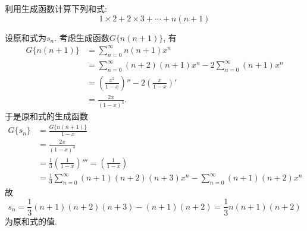 \documentclass[chinese]{assignment}[2019/10/15]
\newcommand{\lr}[3]{\left#1#3\right#2}
\begin{document}
    \begin{problem}
        利用生成函数计算下列和式:
        \begin{equation}
            1\times 2 + 2\times 3 + \dotsb + n(n+1)
        \end{equation}
    \end{problem}
    \begin{solution}
        设原和式为$s_n$. 考虑生成函数$G\{n(n+1)\}$, 有
        \begin{equation}
            \begin{aligned}
                G\{n(n+1)\}
                &=\sum_{n=0}^\infty n(n+1)x^n\\
                &= \sum_{n=0}^\infty (n+2)(n+1)x^n - 2\sum_{n=0}^{\infty}(n+1)x^n\\
                &= \lr(){\frac{x^2}{1-x}}'' - 2\lr(){\frac{x}{1-x}}'\\
                &= \frac{2x}{(1-x)^3}.
            \end{aligned}
        \end{equation}
        于是原和式的生成函数
        \begin{equation}
            \begin{aligned}
                G\{s_n\}
                &= \frac{G\{n(n+1)\}}{1-x}\\
                &= \frac{2x}{(1-x)^4}\\
                &= \frac{1}{3}\lr(){\frac{1}{1-x}}''' = \lr(){\frac{1}{1-x}}\\
                &= \frac{1}{3}\sum_{n=0}^\infty (n+1)(n+2)(n+3)x^n - \sum_{n=0}^\infty (n+1)(n+2)x^n
            \end{aligned}
        \end{equation}
        故
        \begin{equation}
            s_n = \frac{1}{3}(n+1)(n+2)(n+3) - (n+1)(n+2) = \frac{1}{3}n(n+1)(n+2)
        \end{equation}
        为原和式的值.
    \end{solution}
\end{document}
